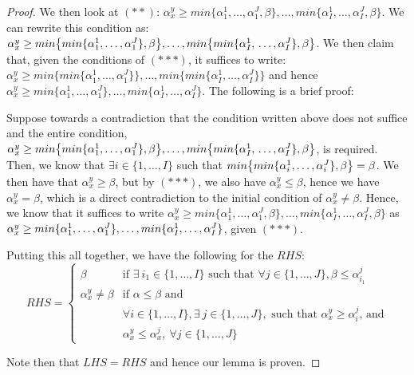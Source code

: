\documentclass{article} %
\begin{document}
\begin{proof}
We then look at $(**)$: $\alpha_x^y\geq min\{\alpha_1^1,\ldots,\alpha_1^J,\beta\},\ldots,min\{\alpha_I^1,\ldots,\alpha_I^J,\beta\}$. We can rewrite this condition as: $\alpha_x^y\geq min\big\{min\{\alpha_1^1,\ldots,\alpha_1^J\},\beta\big\},\ldots,min\big\{min\{\alpha_I^1,\\\ldots,\alpha_I^J\},\beta\big\}$. We then claim that, given the conditions of $(***)$, it suffices to write: $\alpha_x^y\geq min\big\{min\{\alpha_1^1,\ldots,\alpha_1^J\}\big\},\ldots,min\big\{min\{\alpha_I^1,\ldots,\alpha_I^J\}\big\}$ and hence $\alpha_x^y\geq min\{\alpha_1^1,\ldots,\alpha_1^J\},\ldots,min\{\alpha_I^1,\ldots,\alpha_I^J\}$. The following is a brief proof:

Suppose towards a contradiction that the condition written above does not suffice and the entire condition, $\alpha_x^y\geq min\big\{min\{\alpha_1^1,\ldots,\alpha_1^J\},\beta\big\},\ldots,min\big\{min\{\alpha_I^1,\\\ldots,\alpha_I^J\},\beta\big\}$, is required. Then, we know that $\exists i\in\{1,\ldots,I\}$ such that $min\big\{\\min\{\alpha_i^1,\ldots,\alpha_i^J\},\beta\big\}=\beta$. We then have that $\alpha_x^y\geq\beta$, but by $(***)$, we also have $\alpha_x^y\leq\beta$, hence we have $\alpha_x^y=\beta$, which is a direct contradiction to the initial condition of $\alpha_x^y\not=\beta$. Hence, we know that it suffices to write $\alpha_x^y\geq min\{\alpha_1^1,\ldots,\alpha_1^J,\beta\},\ldots,min\{\alpha_I^1,\ldots,\alpha_I^J,\beta\}$ as $\alpha_x^y\geq min\{\alpha_1^1,\ldots,\alpha_1^J\},\ldots,min\{\\ \alpha_I^1,\ldots,\alpha_I^J\}$, given $(***)$.

Putting this all together, we have the following for the $RHS$:
\[
RHS=
\begin{cases}
\beta & \textrm{if }\exists\ i_1\in\{1,\ldots,I\} \textrm{ such that }\forall j\in\{1,\ldots,J\}, \beta\leq\alpha_{i_1}^j \\
\alpha_x^y\not=\beta & \textrm{if } \alpha\leq\beta \textrm{ and}\\
& \forall i\in\{1,\ldots,I\}, \exists\ j\in\{1,\ldots,J\}, \textrm{ such that } \alpha_x^y\geq\alpha_i^j \textrm{, and}\\
& \alpha_x^y\leq\alpha_x^j,\ \forall j\in\{1,\ldots,J\}
\end{cases}
\]

Note then that $LHS=RHS$ and hence our lemma is proven.
\end{proof}
\end{document}
